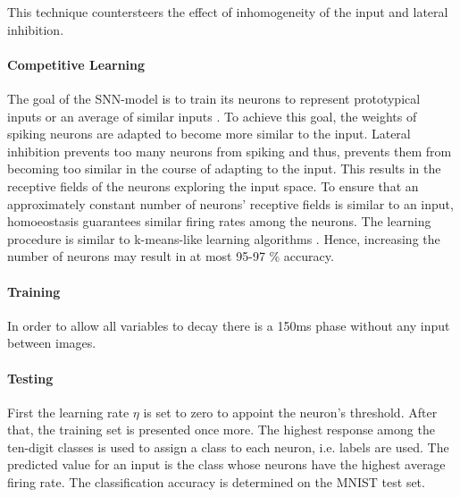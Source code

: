 This technique countersteers the effect of inhomogeneity of the input and lateral inhibition.


\paragraph{\textbf{Competitive Learning}}
The goal of the \ac{SNN}-model is to train its neurons to represent prototypical inputs or an average of similar inputs \cite{SNN}.
To achieve this goal, the weights of spiking neurons are adapted to become more similar to the input.
Lateral inhibition prevents too many neurons from spiking and thus, prevents them from becoming too similar in the course of adapting to the input.
This results in the receptive fields of the neurons exploring the input space.
To ensure that an approximately constant number of neurons' receptive fields is similar to an input, 
homoeostasis guarantees similar firing rates among the neurons.
The learning procedure is similar to k-means-like learning algorithms \cite{SNN}.
Hence, increasing the number of neurons may result in at most 95-97 \% accuracy.


\paragraph{\textbf{Training}}
In order to allow all variables to decay there is a 150ms phase without any input between images.

\paragraph{\textbf{Testing}}
First the learning rate $\eta$ is set to zero to appoint the neuron's threshold.
After that, the training set is presented once more.
The highest response among the ten-digit classes is used to assign a class to each neuron, i.e. labels are used.
The predicted value for an input is the class whose neurons have the highest average firing rate.
The classification accuracy is determined on the MNIST test set.